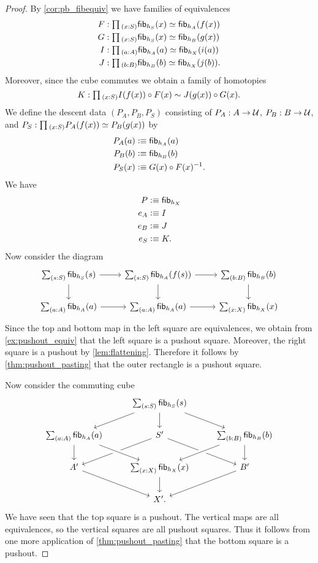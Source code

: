 \begin{proof}
By \cref{cor:pb_fibequiv} we have families of equivalences
\begin{align*}
F & : \prd{x:S}\eqv{\fib{h_S}{x}}{\fib{h_A}{f(x)}} \\
G & : \prd{x:S}\eqv{\fib{h_S}{x}}{\fib{h_B}{g(x)}} \\
I & : \prd{a:A}\eqv{\fib{h_A}{a}}{\fib{h_X}{i(a)}} \\
J & : \prd{b:B}\eqv{\fib{h_B}{b}}{\fib{h_X}{j(b)}}. 
\end{align*}
Moreover, since the cube commutes we obtain a family of homotopies
\begin{equation*}
K : \prd{x:S} I(f(x))\circ F(x) \htpy J(g(x))\circ G(x).
\end{equation*}
We define the descent data $(P_A,P_B,P_S)$ consisting of $P_A:A\to\mathcal{U}$, $P_B:B\to\mathcal{U}$, and $P_S:\prd{x:S}\eqv{P_A(f(x))}{P_B(g(x))}$ by
\begin{align*}
P_A(a) & \vcentcolon\equiv \mathsf{fib}_{h_A}(a) \\
P_B(b) & \vcentcolon\equiv \mathsf{fib}_{h_B}(b) \\
P_S(x) & \vcentcolon\equiv G(x)\circ F(x)^{-1}.
\end{align*}
We have
\begin{align*}
P & \vcentcolon\equiv \mathsf{fib}_{h_X} \\
e_A & \vcentcolon\equiv I \\
e_B & \vcentcolon\equiv J \\
e_S & \vcentcolon\equiv K.
\end{align*}
Now consider the diagram
\begin{equation*}
\begin{tikzcd}
\sm{s:S}\fib{h_S}{s} \arrow[r] \arrow[d] & \sm{s:S}\fib{h_A}{f(s)} \arrow[r] \arrow[d] & \sm{b:B}\fib{h_B}{b} \arrow[d] \\
\sm{a:A}\fib{h_A}{a} \arrow[r] & \sm{a:A}\fib{h_A}{a} \arrow[r] & \sm{x:X}\fib{h_X}{x}
\end{tikzcd}
\end{equation*}
Since the top and bottom map in the left square are equivalences, we obtain from \cref{ex:pushout_equiv} that the left square is a pushout square. Moreover, the right square is a pushout by \cref{lem:flattening}. Therefore it follows by \cref{thm:pushout_pasting} that the outer rectangle is a pushout square.

Now consider the commuting cube
\begin{equation*}
\begin{tikzcd}
& \sm{s:S}\fib{h_S}{s} \arrow[dl] \arrow[dr] \arrow[d] \\
\sm{a:A}\fib{h_A}{a} \arrow[d] & S' \arrow[dl] \arrow[dr] & \sm{b:B}\fib{h_B}{b} \arrow[dl,crossing over] \arrow[d] \\
A' \arrow[dr,swap] & \sm{x:X}\fib{h_X}{x} \arrow[d] \arrow[from=ul,crossing over] & B' \arrow[dl] \\
& X'.
\end{tikzcd}
\end{equation*}
We have seen that the top square is a pushout. The vertical maps are all equivalences, so the vertical squares are all pushout squares. Thus it follows from one more application of \cref{thm:pushout_pasting} that the bottom square is a pushout.
\end{proof}

